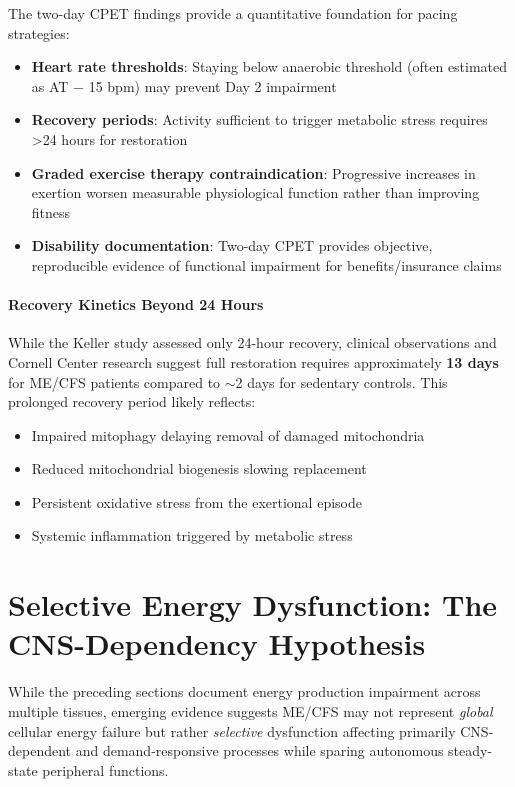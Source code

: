 The two-day CPET findings provide a quantitative foundation for pacing strategies:

\begin{itemize}
    \item \textbf{Heart rate thresholds}: Staying below anaerobic threshold (often estimated as AT $-$ 15 bpm) may prevent Day 2 impairment
    \item \textbf{Recovery periods}: Activity sufficient to trigger metabolic stress requires >24 hours for restoration
    \item \textbf{Graded exercise therapy contraindication}: Progressive increases in exertion worsen measurable physiological function rather than improving fitness
    \item \textbf{Disability documentation}: Two-day CPET provides objective, reproducible evidence of functional impairment for benefits/insurance claims
\end{itemize}

\paragraph{Recovery Kinetics Beyond 24 Hours}

While the Keller study assessed only 24-hour recovery, clinical observations and Cornell Center research suggest full restoration requires approximately \textbf{13 days} for ME/CFS patients compared to $\sim$2 days for sedentary controls. This prolonged recovery period likely reflects:

\begin{itemize}
    \item Impaired mitophagy delaying removal of damaged mitochondria
    \item Reduced mitochondrial biogenesis slowing replacement
    \item Persistent oxidative stress from the exertional episode
    \item Systemic inflammation triggered by metabolic stress
\end{itemize}

\section{Selective Energy Dysfunction: The CNS-Dependency Hypothesis}
\label{sec:selective-energy-dysfunction}

While the preceding sections document energy production impairment across multiple tissues, emerging evidence suggests ME/CFS may not represent \emph{global} cellular energy failure but rather \emph{selective} dysfunction affecting primarily CNS-dependent and demand-responsive processes while sparing autonomous steady-state peripheral functions.

